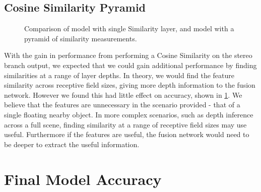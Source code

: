 \documentclass[ %
                    author={Gavin Parker},
                supervisor={Dr. Neill Campbell},
                    degree={MEng},
                     title={Deep Learning for Illumination Estimation from Stereo Images},
                  subtitle={},
                      type={Research},
                      year={2018} ]{dissertation}
\begin{document}
\subsection{Cosine Similarity Pyramid}
\begin{figure}[H]
\setlength\figureheight{6cm}
\setlength\figurewidth{12cm}
\centering

\caption{Comparison of model with single Similarity layer, and model with a pyramid of similarity measurements.}
\label{fig:pyr_comp}
\end{figure}
With the gain in performance from performing a Cosine Similarity on the stereo branch output, we expected that we could gain additional performance by finding similarities at a range of layer depths. In theory, we would find the feature similarity across receptive field sizes, giving more depth information to the fusion network. However we found this had little effect on accuracy, shown in \ref{fig:pyr_comp}. We believe that the features are unnecessary in the scenario provided - that of a single floating nearby object. In more complex scenarios, such as depth inference across a full scene, finding similarity at a range of receptive field sizes may use useful. Furthermore if the features are useful, the fusion network would need to be deeper to extract the useful information.
\section{Final Model Accuracy}
\end{document}
